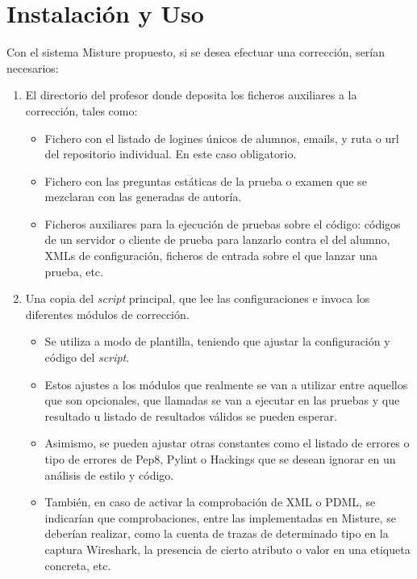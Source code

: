 \cleardoublepage
\appendix
\chapter{Instalación y Uso}
\label{app:instalacion}


Con el sistema Misture propuesto, si se desea efectuar una corrección, serían necesarios:

\begin{enumerate}
\item El directorio del profesor donde deposita los ficheros auxiliares a la corrección, tales como:

\begin{itemize}
\item Fichero con el listado de logines únicos de alumnos, emails, y ruta o url del repositorio individual. En este caso obligatorio.

\item Fichero con las preguntas estáticas de la prueba o examen que se mezclaran con las generadas de autoría.

\item Ficheros auxiliares para la ejecución de pruebas sobre el código: códigos de un servidor o cliente de prueba para lanzarlo contra el del alumno, XMLs de configuración, ficheros de entrada sobre el que lanzar una prueba, etc.
\end{itemize}


\item Una copia del \textit{script} principal, que lee las configuraciones e invoca los diferentes módulos de corrección.

\begin{itemize}
\item Se utiliza a modo de plantilla, teniendo que ajustar la configuración y código del \textit{script}.

\item Estos ajustes a los módulos que realmente se van a utilizar entre aquellos que son opcionales, que llamadas se van a ejecutar en las pruebas y que resultado u listado de resultados válidos se pueden esperar.

\item Asimismo, se pueden ajustar otras constantes como el listado de errores o tipo de errores de Pep8, Pylint o Hackings que se desean ignorar en un análisis de estilo y código.

\item También, en caso de activar la comprobación de XML o PDML, se indicarían que comprobaciones, entre las implementadas en Misture, se deberían realizar, como la cuenta de trazas de determinado tipo en la captura Wireshark, la presencia de cierto atributo o valor en una etiqueta concreta, etc.
\end{itemize}
\end{enumerate}

